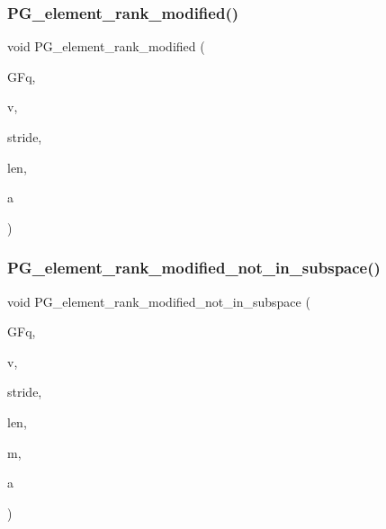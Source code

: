 \mbox{\label{projective_8_c_a9cd1a8bf5b88a038e33862f6c2c3dd36}} 
\subsubsection{\texorpdfstring{P\+G\+\_\+element\+\_\+rank\+\_\+modified()}{PG\_element\_rank\_modified()}}
{\footnotesize\ttfamily void P\+G\+\_\+element\+\_\+rank\+\_\+modified (\begin{DoxyParamCaption}\item[{\mbox{\hyperlink{classfinite__field}{finite\+\_\+field}} \&}]{G\+Fq,  }\item[{\mbox{\hyperlink{galois_8h_a09fddde158a3a20bd2dcadb609de11dc}{I\+NT}} $\ast$}]{v,  }\item[{\mbox{\hyperlink{galois_8h_a09fddde158a3a20bd2dcadb609de11dc}{I\+NT}}}]{stride,  }\item[{\mbox{\hyperlink{galois_8h_a09fddde158a3a20bd2dcadb609de11dc}{I\+NT}}}]{len,  }\item[{\mbox{\hyperlink{galois_8h_a09fddde158a3a20bd2dcadb609de11dc}{I\+NT}} \&}]{a }\end{DoxyParamCaption})}

\mbox{\label{projective_8_c_a898cc8f2f45dbbd81b8bad9f3952de7c}} 
\subsubsection{\texorpdfstring{P\+G\+\_\+element\+\_\+rank\+\_\+modified\+\_\+not\+\_\+in\+\_\+subspace()}{PG\_element\_rank\_modified\_not\_in\_subspace()}}
{\footnotesize\ttfamily void P\+G\+\_\+element\+\_\+rank\+\_\+modified\+\_\+not\+\_\+in\+\_\+subspace (\begin{DoxyParamCaption}\item[{\mbox{\hyperlink{classfinite__field}{finite\+\_\+field}} \&}]{G\+Fq,  }\item[{\mbox{\hyperlink{galois_8h_a09fddde158a3a20bd2dcadb609de11dc}{I\+NT}} $\ast$}]{v,  }\item[{\mbox{\hyperlink{galois_8h_a09fddde158a3a20bd2dcadb609de11dc}{I\+NT}}}]{stride,  }\item[{\mbox{\hyperlink{galois_8h_a09fddde158a3a20bd2dcadb609de11dc}{I\+NT}}}]{len,  }\item[{\mbox{\hyperlink{galois_8h_a09fddde158a3a20bd2dcadb609de11dc}{I\+NT}}}]{m,  }\item[{\mbox{\hyperlink{galois_8h_a09fddde158a3a20bd2dcadb609de11dc}{I\+NT}} \&}]{a }\end{DoxyParamCaption})}

